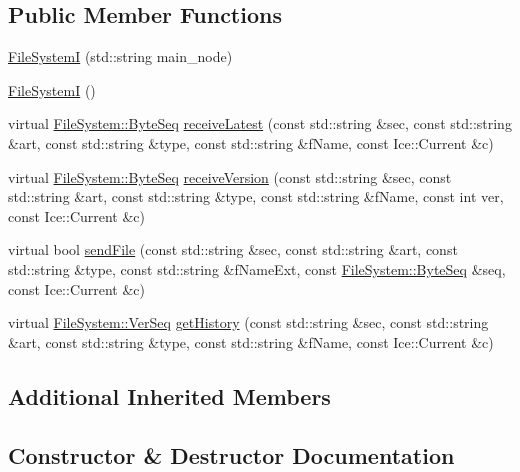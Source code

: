 \subsection*{Public Member Functions}
\begin{DoxyCompactItemize}
\item 
\hyperlink{class_file_system_i_a74df9a51af59eeb364c5f570f955d82a}{File\+System\+I} (std\+::string main\+\_\+node)
\item 
\hyperlink{class_file_system_i_a9a61c34763e63d0d81183ff2ed7137f2}{File\+System\+I} ()
\item 
virtual \hyperlink{namespace_file_system_a5c85de065f9c451ae1d1dea2dacb68c5}{File\+System\+::\+Byte\+Seq} \hyperlink{class_file_system_i_abc9d41f5639080ba30ed563e579249c2}{receive\+Latest} (const std\+::string \&sec, const std\+::string \&art, const std\+::string \&type, const std\+::string \&f\+Name, const Ice\+::\+Current \&c)
\item 
virtual \hyperlink{namespace_file_system_a5c85de065f9c451ae1d1dea2dacb68c5}{File\+System\+::\+Byte\+Seq} \hyperlink{class_file_system_i_a5fa337576e6762b2b77f80b6e081b016}{receive\+Version} (const std\+::string \&sec, const std\+::string \&art, const std\+::string \&type, const std\+::string \&f\+Name, const int ver, const Ice\+::\+Current \&c)
\item 
virtual bool \hyperlink{class_file_system_i_a6f436b8f834663f35556b9e40c59df73}{send\+File} (const std\+::string \&sec, const std\+::string \&art, const std\+::string \&type, const std\+::string \&f\+Name\+Ext, const \hyperlink{namespace_file_system_a5c85de065f9c451ae1d1dea2dacb68c5}{File\+System\+::\+Byte\+Seq} \&seq, const Ice\+::\+Current \&c)
\item 
virtual \hyperlink{namespace_file_system_ac32dc1eb34c060160b52edc7c4e37d6e}{File\+System\+::\+Ver\+Seq} \hyperlink{class_file_system_i_ae61cfd5357bf5c2b380bdb87c9459dd8}{get\+History} (const std\+::string \&sec, const std\+::string \&art, const std\+::string \&type, const std\+::string \&f\+Name, const Ice\+::\+Current \&c)
\end{DoxyCompactItemize}
\subsection*{Additional Inherited Members}


\subsection{Constructor \& Destructor Documentation}
\hypertarget{class_file_system_i_a74df9a51af59eeb364c5f570f955d82a}{}
